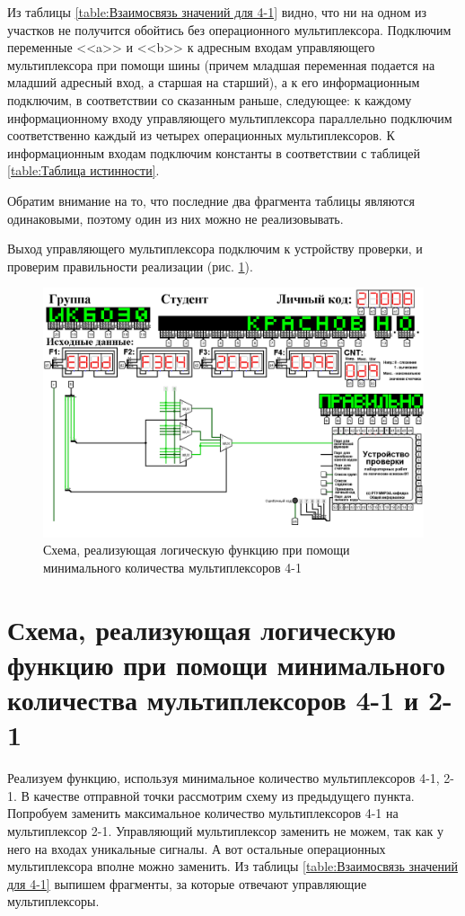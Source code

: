 \documentclass{mirea}
\begin{document}
Из таблицы \ref{table:Взаимосвязь значений для 4-1} видно, что ни на одном из участков не получится обойтись без операционного мультиплексора. Подключим переменные <<a>> и <<b>> к адресным входам управляющего мультиплексора при помощи шины (причем младшая переменная подается на младший адресный вход, а старшая на старший), а к его информационным подключим, в соответствии со сказанным раньше, следующее: к каждому информационному входу управляющего мультиплексора параллельно подключим соответственно каждый из четырех операционных мультиплексоров. К информационным входам подключим константы в соответствии с таблицей \ref{table:Таблица истинности}.

Обратим внимание на то, что последние два фрагмента таблицы являются одинаковыми, поэтому один из них можно не реализовывать. 

Выход управляющего мультиплексора подключим к устройству проверки, и проверим правильности реализации (рис. \ref{circ:Мультиплекс 4-1}).

\begin{figure}[h!]
	\includegraphics[width=\textwidth]{Мультиплекс 4-1.png}
	\caption{Схема, реализующая логическую функцию при помощи минимального количества мультиплексоров 4-1}
	\label{circ:Мультиплекс 4-1}
\end{figure}

\section{Схема, реализующая логическую функцию при помощи минимального количества мультиплексоров 4-1 и 2-1}
Реализуем функцию, используя минимальное количество мультиплексоров 4-1, 2-1. В качестве отправной точки рассмотрим схему из предыдущего пункта. Попробуем заменить максимальное количество мультиплексоров 4-1 на мультиплексор 2-1. Управляющий мультиплексор заменить не можем, так как у него на входах уникальные сигналы. А вот остальные операционных мультиплексора вполне можно заменить. Из таблицы \ref{table:Взаимосвязь значений для 4-1} выпишем фрагменты, за которые отвечают управляющие мультиплексоры.
\end{document}
